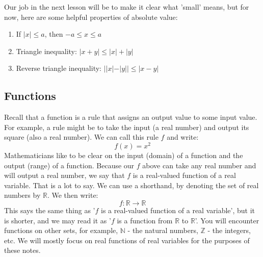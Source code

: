 \documentclass[12pt,a4paper]{article} %
\begin{document}
Our job in the next lesson will be to make it clear what 'small' means, but for now, here are some helpful properties of absolute value:\\

\begin{enumerate}
\item If $|x|\leq a$, then $-a\leq x\leq a$
\item Triangle inequality:  $|x +y| \leq |x| +|y|$
\item Reverse triangle inequality: $||x|-|y|| \leq |x-y|$
\end{enumerate}

\subsection{Functions}
Recall that a function is a rule that assigns an output value to some input value.  For example, a rule might be to take the input (a real number) and output its square (also a real number).  We can call this rule $f$ and write:
\begin{equation*}
f(x) = x^2
\end{equation*}
Mathematicians like to be clear on the input (domain) of a function and the output (range) of a function.  Because our $f$ above can take any real number and will output a real number, we say that $f$ is a real-valued function of a real variable.  That is a lot to say.  We can use a shorthand, by denoting the set of real numbers by $\mathbb{R}$.  We then write:
\begin{equation}
f:\mathbb{R}\rightarrow \mathbb{R}
\end{equation}
This says the same thing as '$f$ is a real-valued function of a real variable', but it is shorter, and we may read it as '$f$ is a function from $\mathbb{R}$ to $\mathbb{R}$'.  You will encounter functions on other sets, for example, $\mathbb{N}$ - the natural numbers, $\mathbb{Z}$ - the integers, etc.  We will mostly focus on real functions of real variables for the purposes of these notes. 
\end{document}
